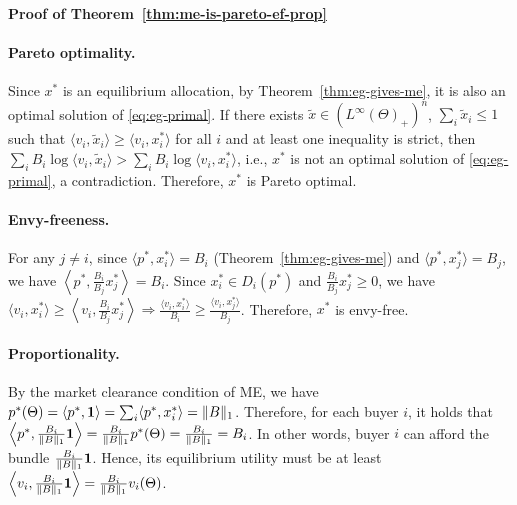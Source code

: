 	\smallskip\noindent\textbf{Proof of Theorem~\ref{thm:me-is-pareto-ef-prop}}
	\paragraph{Pareto optimality.}
	Since $x^*$ is an equilibrium allocation, by Theorem~\ref{thm:eg-gives-me}, it is also an optimal solution of \eqref{eq:eg-primal}. If there exists $\tilde{x}\in (L^\infty(\Theta)_+)^n$, $\sum_i \tilde{x}_i \leq 1$ such that $\langle v_i, \tilde{x}_i \rangle \geq \langle v_i, x^*_i \rangle$ for all $i$ and at least one inequality is strict, then 
	$\sum_i B_i \log \langle v_i, \tilde{x}_i \rangle > \sum_i B_i \log \langle v_i, x^*_i \rangle$,
	i.e., $x^*$ is not an optimal solution of \eqref{eq:eg-primal}, a contradiction. Therefore, $x^*$ is Pareto optimal.
	
	\paragraph{Envy-freeness.}
	For any $j\neq i$, since $\langle p^*, x^*_i \rangle = B_i$ (Theorem~\ref{thm:eg-gives-me}) and $\langle p^*, x^*_j \rangle = B_j$, we have 
	$ \left \langle p^*, \frac{B_i}{B_j}x^*_j \right \rangle = B_i$.
	Since $x^*_i \in D_i(p^*)$ and $\frac{B_i}{B_j}x^*_j \geq 0$, we have 
	$ \langle v_i, x^*_i \rangle \geq \left\langle v_i, \frac{B_i}{B_j} x^*_j \right \rangle \Rightarrow \frac{\langle v_i, x^*_i \rangle}{B_i} \geq \frac{\langle v_i, x^*_j \rangle}{B_j}$.
	Therefore, $x^*$ is envy-free.
	
	\paragraph{Proportionality.}
	By the market clearance condition of ME, we have
	$ p^*(\Theta) = \langle p^*, \mathbf{1} \rangle = \sum_i \langle p^*, x^*_i\rangle = \|B\|_1$.
	Therefore, for each buyer $i$, it holds that 
	$ \left \langle p^*, \frac{B_i}{\|B\|_1} \mathbf{1} \right \rangle = \frac{B_i}{\|B\|_1} p^*(\Theta) = \frac{B_i}{\|B\|_1} = B_i$.
	In other words, buyer $i$ can afford the bundle $\frac{B_i}{\|B\|_1} \mathbf{1} $. Hence, its equilibrium utility must be at least
	$ \left \langle v_i,\frac{B_i}{\|B\|_1}\mathbf{1} \right\rangle = \frac{B_i}{\|B\|_1}v_i(\Theta)$.
	
